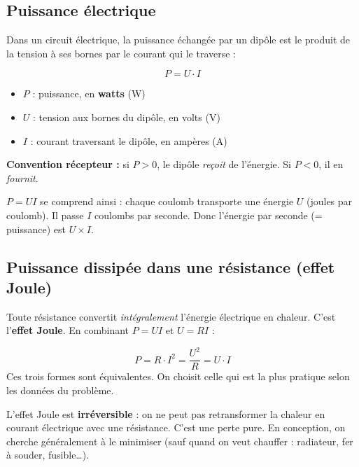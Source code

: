 \documentclass[12pt,a4paper,twoside]{book}
\begin{document}
\subsection{Puissance électrique}

Dans un circuit électrique, la puissance échangée par un dipôle est le produit de la tension à ses bornes par le courant qui le traverse :

\begin{formule}
\[
\boxed{P = U \cdot I}
\]
\begin{itemize}[nosep]
\item $P$ : puissance, en \textbf{watts} (W)
\item $U$ : tension aux bornes du dipôle, en volts (V)
\item $I$ : courant traversant le dipôle, en ampères (A)
\end{itemize}
\vspace{0.2cm}
\textbf{Convention récepteur :} si $P > 0$, le dipôle \textit{reçoit} de l'énergie. Si $P < 0$, il en \textit{fournit}.
\end{formule}

\begin{intuition}
$P = UI$ se comprend ainsi : chaque coulomb transporte une énergie $U$ (joules par coulomb). Il passe $I$ coulombs par seconde. Donc l'énergie par seconde (= puissance) est $U \times I$.
\end{intuition}

\subsection{Puissance dissipée dans une résistance (effet Joule)}

Toute résistance convertit \textit{intégralement} l'énergie électrique en chaleur. C'est l'\textbf{effet Joule}. En combinant $P = UI$ et $U = RI$ :

\begin{formule}
\[
\boxed{P = R \cdot I^2 = \frac{U^2}{R} = U \cdot I}
\]
Ces trois formes sont équivalentes. On choisit celle qui est la plus pratique selon les données du problème.
\end{formule}

\begin{attention}
L'effet Joule est \textbf{irréversible} : on ne peut pas retransformer la chaleur en courant électrique avec une résistance. C'est une perte pure. En conception, on cherche généralement à le minimiser (sauf quand on veut chauffer : radiateur, fer à souder, fusible\ldots).
\end{attention}
\end{document}
